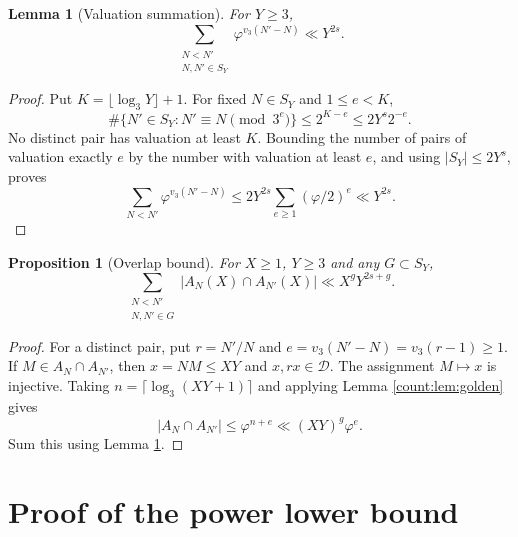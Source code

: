 \documentclass[11pt]{article}
\newtheorem{lemma}[theorem]{Lemma}
\newtheorem{proposition}[theorem]{Proposition}
\theoremstyle{remark}
\newcommand{\D}{\mathcal D}
\newcommand{\N}{\mathbb N}
\begin{document}
\begin{lemma}[Valuation summation]\label{count:lem:valuation}
For $Y\ge3$,
\[
 \sum_{\substack{N<N'\\N,N'\in S_Y}}
       \varphi^{v_3(N'-N)}\ll Y^{2s}.
\]
\end{lemma}
\begin{proof}
Put $K=\lfloor\log_3Y\rfloor+1$. For fixed $N\in S_Y$ and $1\le e<K$,
\[
 \#\{N'\in S_Y:N'\equiv N\pmod{3^e}\}
 \le2^{K-e}\le2Y^s2^{-e}.
\]
No distinct pair has valuation at least $K$. Bounding the number of
pairs of valuation exactly $e$ by the number with valuation at least
$e$, and using $|S_Y|\le2Y^s$, proves
\[
 \sum_{N<N'}\varphi^{v_3(N'-N)}
 \le2Y^{2s}\sum_{e\ge1}(\varphi/2)^e\ll Y^{2s}.
\]
\end{proof}

\begin{proposition}[Overlap bound]\label{count:prop:overlap}
For $X\ge1$, $Y\ge3$ and any $G\subset S_Y$,
\[
 \sum_{\substack{N<N'\\N,N'\in G}}|A_N(X)\cap A_{N'}(X)|
 \ll X^gY^{2s+g}.
\]
\end{proposition}
\begin{proof}
For a distinct pair, put $r=N'/N$ and $e=v_3(N'-N)=v_3(r-1)\ge1$.
If $M\in A_N\cap A_{N'}$, then $x=NM\le XY$ and $x,rx\in\D$.
The assignment $M\mapsto x$ is injective. Taking
$n=\lceil\log_3(XY+1)\rceil$ and applying Lemma \ref{count:lem:golden} gives
\[
 |A_N\cap A_{N'}|\le\varphi^{n+e}
 \ll (XY)^g\varphi^e.
\]
Sum this using Lemma \ref{count:lem:valuation}.
\end{proof}

\section{Proof of the power lower bound}
\end{document}
